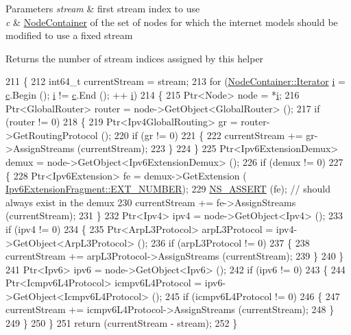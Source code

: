 \begin{DoxyParams}{Parameters}
{\em stream} & first stream index to use \\
\hline
{\em c} & \hyperlink{classns3_1_1NodeContainer}{Node\+Container} of the set of nodes for which the internet models should be modified to use a fixed stream \\
\hline
\end{DoxyParams}
\begin{DoxyReturn}{Returns}
the number of stream indices assigned by this helper 
\end{DoxyReturn}

\begin{DoxyCode}
211 \{
212   int64\_t currentStream = stream;
213   \textcolor{keywordflow}{for} (\hyperlink{classns3_1_1NodeContainer_aa1a9f2d2b09bfef7d066d3974bca2cc4}{NodeContainer::Iterator} \hyperlink{bernuolliDistribution_8m_a6f6ccfcf58b31cb6412107d9d5281426}{i} = \hyperlink{lte_2model_2fading-traces_2fading__trace__generator_8m_ae0323a9039add2978bf5b49550572c7c}{c}.Begin (); \hyperlink{bernuolliDistribution_8m_a6f6ccfcf58b31cb6412107d9d5281426}{i} != \hyperlink{lte_2model_2fading-traces_2fading__trace__generator_8m_ae0323a9039add2978bf5b49550572c7c}{c}.End (); ++
      \hyperlink{bernuolliDistribution_8m_a6f6ccfcf58b31cb6412107d9d5281426}{i})
214     \{
215       Ptr<Node> node = *\hyperlink{bernuolliDistribution_8m_a6f6ccfcf58b31cb6412107d9d5281426}{i};
216       Ptr<GlobalRouter> router = node->GetObject<GlobalRouter> ();
217       \textcolor{keywordflow}{if} (router != 0)
218         \{
219           Ptr<Ipv4GlobalRouting> gr = router->GetRoutingProtocol ();
220           \textcolor{keywordflow}{if} (gr != 0)
221             \{
222               currentStream += gr->AssignStreams (currentStream);
223             \}
224         \}
225       Ptr<Ipv6ExtensionDemux> demux = node->GetObject<Ipv6ExtensionDemux> ();
226       \textcolor{keywordflow}{if} (demux != 0)
227         \{
228           Ptr<Ipv6Extension> fe = demux->GetExtension (
      \hyperlink{classns3_1_1Ipv6ExtensionFragment_ae87f2248d10cdb25e8e082fa74049425}{Ipv6ExtensionFragment::EXT\_NUMBER});
229           \hyperlink{assert_8h_a6dccdb0de9b252f60088ce281c49d052}{NS\_ASSERT} (fe);  \textcolor{comment}{// should always exist in the demux}
230           currentStream += fe->AssignStreams (currentStream);
231         \}
232       Ptr<Ipv4> ipv4 = node->GetObject<Ipv4> ();
233       \textcolor{keywordflow}{if} (ipv4 != 0)
234         \{
235           Ptr<ArpL3Protocol> arpL3Protocol = ipv4->GetObject<ArpL3Protocol> ();
236           \textcolor{keywordflow}{if} (arpL3Protocol != 0)
237             \{
238               currentStream += arpL3Protocol->AssignStreams (currentStream);
239             \}
240         \}
241       Ptr<Ipv6> ipv6 = node->GetObject<Ipv6> ();
242       \textcolor{keywordflow}{if} (ipv6 != 0)
243         \{
244           Ptr<Icmpv6L4Protocol> icmpv6L4Protocol = ipv6->GetObject<Icmpv6L4Protocol> ();
245           \textcolor{keywordflow}{if} (icmpv6L4Protocol != 0)
246             \{
247               currentStream += icmpv6L4Protocol->AssignStreams (currentStream);
248             \}
249         \}
250     \}
251   \textcolor{keywordflow}{return} (currentStream - stream);
252 \}
\end{DoxyCode}


